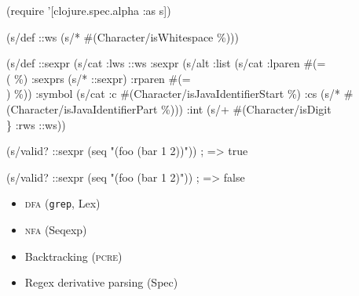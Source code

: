 \documentclass{beamer}
\begin{document}
\begin{frame}[fragile]

{\scriptsize
\begin{semiverbatim}
(require '[clojure.spec.alpha :as s])

(s/def ::ws (s/* \#(Character/isWhitespace \%)))

(s/def ::sexpr
  (s/cat
    :lws ::ws
    :sexpr (s/alt
             :list (s/cat :lparen \#(= \\( \%)
                          :sexprs (s/* ::sexpr)
                          :rparen #(= \\) \%))
             :symbol (s/cat :c #(Character/isJavaIdentifierStart \%)
                            :cs (s/* #(Character/isJavaIdentifierPart \%)))
             :int (s/+ \#(Character/isDigit \\\}%
    :rws ::ws))

(s/valid? ::sexpr (seq "(foo (bar 1 2))"))
; => true

(s/valid? ::sexpr (seq "(foo (bar 1 2)"))
; => false
\end{semiverbatim}
}

\end{frame}


\begin{frame}

\begin{itemize}
\item \textsc{dfa} (\texttt{grep}, Lex)
\item \textsc{nfa} (Seqexp)
\item Backtracking (\textsc{pcre})
\item Regex derivative parsing (Spec)
\end{itemize}

\end{frame}
\end{document}
